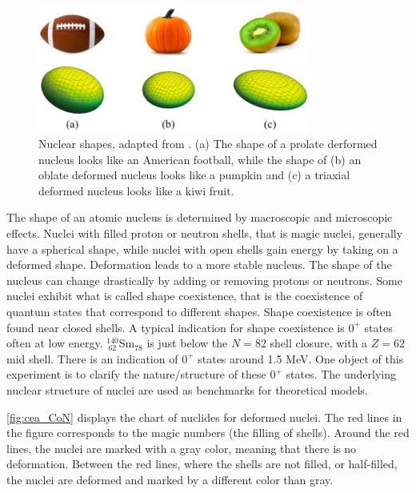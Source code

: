\documentclass[twoside,english]{uiofysmaster/uiofysmaster}
\let\orgautoref\autoref
\renewcommand{\autoref}
        {%
		 \def\sectionautorefname{Section}%
		 \def\subsectionautorefname{Section}%
		 \def\subsubsectionautorefname{Section}%
		 \def\chapterautorefname{Chapter}%
          \orgautoref}
\begin{document}
\begin{figure}[htb]
	\centering
	\includegraphics[width=0.8\textwidth]{Images/nuclear-shapes-v2.png}
	\caption{Nuclear shapes, adapted from \cite{MSU-shapes}. 
	(a) The shape of a prolate derformed nucleus looks like an American football, while the shape of (b) an oblate deformed nucleus looks like a pumpkin and (c) a triaxial deformed nucleus looks like a kiwi fruit.}
	\label{fig:Nuclear-shapes}
\end{figure}

The shape of an atomic nucleus is determined by macroscopic and microscopic effects. 
Nuclei with filled proton or neutron shells, that is magic nuclei, generally have a spherical shape, while nuclei with open shells gain energy by taking on a deformed shape.
Deformation leads to a more stable nucleus.
The shape of the nucleus can change drastically by adding or removing protons or neutrons.
Some nuclei exhibit what is called shape coexistence, that is the coexistence of quantum states that correspond to different shapes.
Shape coexistence is often found near closed shells. 
A typical indication for shape coexistence is $0^+$ states often at low energy. 
$^{140}_{~62}$Sm$_{78}$ is just below the $N = 82$ shell closure, with a $Z = 62$ mid shell. 
There is an indication of $0^+$ states around 1.5 MeV. 
One object of this experiment is to clarify the nature/structure of these $0^+$ states. 
The underlying nuclear structure of nuclei are used as benchmarks for theoretical models.

\autoref{fig:cea_CoN} displays the chart of nuclides for deformed nuclei. 
The red lines in the figure corresponds to the magic numbers (the filling of shells). 
Around the red lines, the nuclei are marked with a gray color, meaning that there is no deformation. 
Between the red lines, where the shells are not filled, or half-filled, the nuclei are deformed and marked by a different color than gray. 
\end{document}
